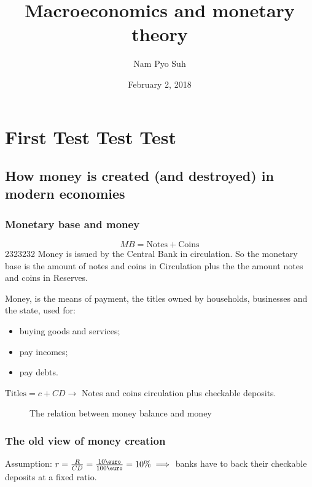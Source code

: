 \documentclass{report}
\title{Macroeconomics and monetary theory}
\author{Nam Pyo Suh}
\date{February 2, 2018}
\begin{document}
\part{First Test Test Test}
\chapter{How money is created (and destroyed) in modern economies}
\section{Monetary base and money}

$$MB=\text{Notes} + \text{Coins}$$ 2323232 Money is issued by the Central Bank in circulation. So the monetary base is the amount of notes and coins in Circulation plus the the amount notes and coins in Reserves. 

Money, is the means of payment, the titles owned by households, businesses and the state, used for:
\begin{itemize}
    \item buying goods and services; 
    \item pay incomes; 
    \item pay debts.
\end{itemize}

$\text{Titles}=c+CD \longrightarrow $ Notes and coins circulation plus checkable deposits.

\begin{figure}[H]
    \centering
{}
    \caption{The relation between money balance and money}
    \label{fig:my_label}
\end{figure}

\clearpage
\section{The old view of money creation}

Assumption: $r=\frac{R}{CD}=\frac{10\text{\euro}}{100\text{\euro}}=10\% \implies$ banks have to back their checkable deposits at a fixed ratio.
\end{document}
